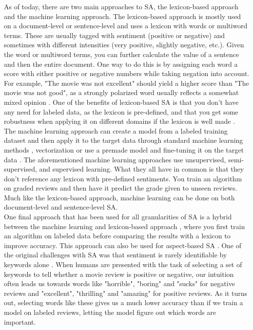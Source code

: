 \documentclass{report}
\begin{document}
As of today, there are two main approaches to SA, the lexicon-based approach and the machine learning approach. The lexicon-based approach is mostly used on a document-level or sentence-level and uses a lexicon with words or multiword terms. These are usually tagged with sentiment (positive or negative) and sometimes with different intensities (very positive, slightly negative, etc.). Given the word or multiword terms, you can further calculate the value of a sentence and then the entire document. One way to do this is by assigning each word a score with either positive or negative numbers while taking negation into account. For example, "The movie was not excellent" should yield a higher score than "The movie was not good", as a strongly polarized word usually reflects a somewhat mixed opinion \cite{taboada-etal-2011-lexicon}. One of the benefits of lexicon-based SA is that you don't have any need for labeled data, as the lexicon is pre-defined, and that you get some robustness when applying it on different domains if the lexicon is well made \cite{taboada-etal-2011-lexicon}.\\
The machine learning approach can create a model from a labeled training dataset and then apply it to the target data through standard machine learning methods \cite{pang-etal-2002-thumbs}, vectorization \cite{Peters:2018, mikolov2013efficient, pennington2014glove} or use a premade model and fine-tuning it on the target data \cite{DBLP:journals/corr/abs-1810-04805}. The aforementioned machine learning approaches use unsupervised, semi-supervised, and supervised learning. What they all have in common is that they don't reference any lexicon with pre-defined sentiments. You train an algorithm on graded reviews and then have it predict the grade given to unseen reviews. Much like the lexicon-based approach, machine learning can be done on both document-level and sentence-level SA.\\
One final approach that has been used for all granularities of SA is a hybrid between the machine learning and lexicon-based approach \cite{zhang2011combining}, where you first train an algorithm on labeled data before comparing the results with a lexicon to improve accuracy. This approach can also be used for aspect-based SA \cite{brun2016xrce}.
One of the original challenges with SA was that sentiment is rarely identifiable by keywords alone \cite{pang-etal-2002-thumbs}. When humans are presented with the task of selecting a set of keywords to tell whether a movie review is positive or negative, our intuition often leads us towards words like "horrible", "boring" and "sucks" for negative reviews and "excellent", "thrilling" and "amazing" for positive reviews. As it turns out, selecting words like these gives us a much lower accuracy than if we train a model on labeled reviews, letting the model figure out which words are important.
\end{document}
